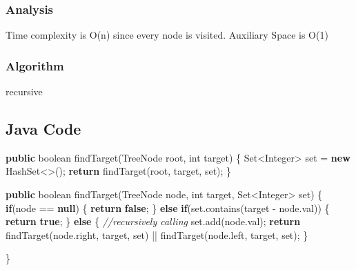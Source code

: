 \documentclass[]{book}
\newenvironment{Shaded}{\begin{snugshade}}{\end{snugshade}}
\newcommand{\BuiltInTok}[1]{#1}
\newcommand{\CommentTok}[1]{\textcolor[rgb]{0.56,0.35,0.01}{\textit{#1}}}
\newcommand{\DataTypeTok}[1]{\textcolor[rgb]{0.13,0.29,0.53}{#1}}
\newcommand{\FunctionTok}[1]{\textcolor[rgb]{0.00,0.00,0.00}{#1}}
\newcommand{\KeywordTok}[1]{\textcolor[rgb]{0.13,0.29,0.53}{\textbf{#1}}}
\newcommand{\NormalTok}[1]{#1}
\begin{document}
\hypertarget{analysis-43}{%
\subsubsection{Analysis}\label{analysis-43}}

Time complexity is O(n) since every node is visited. Auxiliary Space is O(1)

\hypertarget{algorithm-43}{%
\subsubsection{Algorithm}\label{algorithm-43}}

recursive

\hypertarget{java-code-34}{%
\subsection{Java Code}\label{java-code-34}}

\begin{Shaded}
\begin{Highlighting}[]
\KeywordTok{public} \DataTypeTok{boolean} \FunctionTok{findTarget}\NormalTok{(}\BuiltInTok{TreeNode}\NormalTok{ root, }\DataTypeTok{int}\NormalTok{ target) \{}
    \BuiltInTok{Set}\NormalTok{<}\BuiltInTok{Integer}\NormalTok{> set = }\KeywordTok{new} \BuiltInTok{HashSet}\NormalTok{<>();}
    \KeywordTok{return} \FunctionTok{findTarget}\NormalTok{(root, target, set);}
\NormalTok{\}}

\KeywordTok{public} \DataTypeTok{boolean} \FunctionTok{findTarget}\NormalTok{(}\BuiltInTok{TreeNode}\NormalTok{ node, }\DataTypeTok{int}\NormalTok{ target, }\BuiltInTok{Set}\NormalTok{<}\BuiltInTok{Integer}\NormalTok{> set) \{}
    \KeywordTok{if}\NormalTok{(node == }\KeywordTok{null}\NormalTok{) \{}
        \KeywordTok{return} \KeywordTok{false}\NormalTok{;}
\NormalTok{    \} }\KeywordTok{else} \KeywordTok{if}\NormalTok{(set.}\FunctionTok{contains}\NormalTok{(target - node.}\FunctionTok{val}\NormalTok{)) \{}
        \KeywordTok{return} \KeywordTok{true}\NormalTok{;}
\NormalTok{    \} }\KeywordTok{else}\NormalTok{ \{}
        \CommentTok{//recursively calling}
\NormalTok{        set.}\FunctionTok{add}\NormalTok{(node.}\FunctionTok{val}\NormalTok{);}
        \KeywordTok{return} \FunctionTok{findTarget}\NormalTok{(node.}\FunctionTok{right}\NormalTok{, target, set) || }\FunctionTok{findTarget}\NormalTok{(node.}\FunctionTok{left}\NormalTok{, target, set);}
\NormalTok{    \}}

\NormalTok{\}}
\end{Highlighting}
\end{Shaded}
\end{document}

